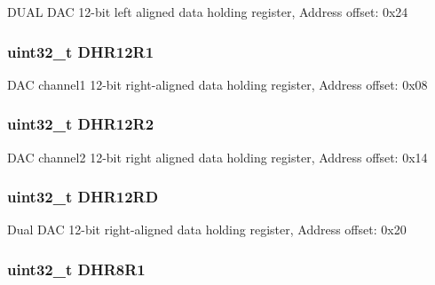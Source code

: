 D\-U\-A\-L D\-A\-C 12-\/bit left aligned data holding register, Address offset\-: 0x24 \hypertarget{struct_d_a_c___type_def_ac2bb55b037b800a25852736afdd7a258}{
\subsubsection[{D\-H\-R12\-R1}]{ uint32\-\_\-t D\-H\-R12\-R1}}\label{struct_d_a_c___type_def_ac2bb55b037b800a25852736afdd7a258}
D\-A\-C channel1 12-\/bit right-\/aligned data holding register, Address offset\-: 0x08 \hypertarget{struct_d_a_c___type_def_a804c7e15dbb587c7ea25511f6a7809f7}{
\subsubsection[{D\-H\-R12\-R2}]{ uint32\-\_\-t D\-H\-R12\-R2}}\label{struct_d_a_c___type_def_a804c7e15dbb587c7ea25511f6a7809f7}
D\-A\-C channel2 12-\/bit right aligned data holding register, Address offset\-: 0x14 \hypertarget{struct_d_a_c___type_def_a1590b77e57f17e75193da259da72095e}{
\subsubsection[{D\-H\-R12\-R\-D}]{ uint32\-\_\-t D\-H\-R12\-R\-D}}\label{struct_d_a_c___type_def_a1590b77e57f17e75193da259da72095e}
Dual D\-A\-C 12-\/bit right-\/aligned data holding register, Address offset\-: 0x20 \hypertarget{struct_d_a_c___type_def_ad0a200e12acad17a5c7d2059159ea7e1}{
\subsubsection[{D\-H\-R8\-R1}]{ uint32\-\_\-t D\-H\-R8\-R1}}\label{struct_d_a_c___type_def_ad0a200e12acad17a5c7d2059159ea7e1}
